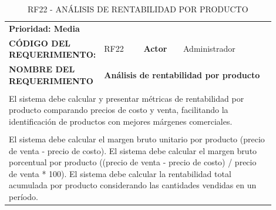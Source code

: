 \begingroup
\renewcommand{\arraystretch}{1.3}
\setlength{\tabcolsep}{6pt}
\centering
\begin{longtable}{|p{0.25\linewidth}|p{0.15\linewidth}|p{0.15\linewidth}|p{0.35\linewidth}|}
\caption{RF22 - ANÁLISIS DE RENTABILIDAD POR PRODUCTO}\label{tab:rf22}\\
\hline
		\rowcolor{tableheaderblue}
		\multicolumn{4}{|l|}{\textbf{Requerimientos funcionales}}                                                                                                                                     \\ \hline
		\multicolumn{4}{|l|}{\textbf{Prioridad: Media}}                                                                                                                                               \\ \hline
		\textbf{CÓDIGO DEL REQUERIMIENTO:}                          & RF22                                                                & \cellcolor{tableheaderblue}\textbf{Actor} & Administrador \\ \hline
		\textbf{NOMBRE DEL REQUERIMIENTO}                           & \multicolumn{3}{l|}{\textbf{Análisis de rentabilidad por producto}}                                                             \\ \hline
		\rowcolor{tableheaderblue}
		\multicolumn{4}{|l|}{\textbf{Descripción}}                                                                                                                                                    \\ \hline
		\multicolumn{4}{|p{0.96\linewidth}|}{%
		El sistema debe calcular y presentar métricas de rentabilidad por producto comparando precios de costo y venta, facilitando la identificación de productos con mejores márgenes comerciales.} \\ \hline
		\rowcolor{tableheaderblue}
		\multicolumn{4}{|l|}{\textbf{Funcionalidad}}                                                                                                                                                  \\ \hline
		\multicolumn{4}{|p{0.96\linewidth}|}{%
		El sistema debe calcular el margen bruto unitario por producto (precio de venta - precio de costo). \newline
		El sistema debe calcular el margen bruto porcentual por producto ((precio de venta - precio de costo) / precio de venta * 100). \newline
		El sistema debe calcular la rentabilidad total acumulada por producto considerando las cantidades vendidas en un período. \newline
}
\end{longtable}
